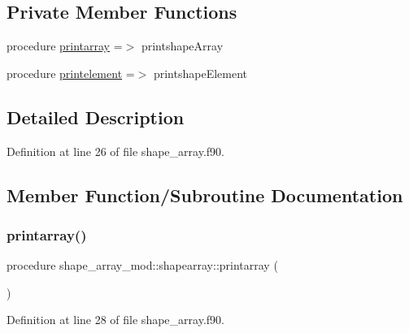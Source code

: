 \subsection*{Private Member Functions}
\begin{DoxyCompactItemize}
\item 
procedure \mbox{\hyperlink{structshape__array__mod_1_1shapearray_a3ee5328343a8ba2b26ee4e91385d009d}{printarray}} =$>$ printshape\+Array
\item 
procedure \mbox{\hyperlink{structshape__array__mod_1_1shapearray_acd1aa17e088e5534c3d9373bd28a3921}{printelement}} =$>$ printshape\+Element
\end{DoxyCompactItemize}


\subsection{Detailed Description}


Definition at line 26 of file shape\+\_\+array.\+f90.



\subsection{Member Function/\+Subroutine Documentation}
\mbox{\label{structshape__array__mod_1_1shapearray_a3ee5328343a8ba2b26ee4e91385d009d}} 
\subsubsection{\texorpdfstring{printarray()}{printarray()}}
{\footnotesize\ttfamily procedure shape\+\_\+array\+\_\+mod\+::shapearray\+::printarray (\begin{DoxyParamCaption}{ }\end{DoxyParamCaption})\hspace{0.3cm}{\ttfamily [private]}}



Definition at line 28 of file shape\+\_\+array.\+f90.

\mbox{\label{structshape__array__mod_1_1shapearray_acd1aa17e088e5534c3d9373bd28a3921}} 

